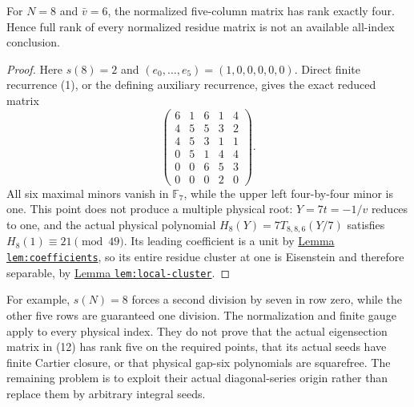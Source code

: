 \documentclass[11pt]{article}
\begin{document}
\begin{proposition}
\label{prop:rank-obstruction}
For $N=8$ and $\bar v=6$, the normalized five-column matrix
has rank exactly four. Hence full rank of every normalized
residue matrix is not an available all-index conclusion.
\end{proposition}
\begin{proof}
Here $s(8)=2$ and $(e_0,\ldots,e_5)=(1,0,0,0,0,0)$.
Direct finite recurrence (1), or the defining auxiliary recurrence,
gives the exact reduced matrix
\[
 \begin{pmatrix}
 6&1&6&1&4\\
 4&5&5&3&2\\
 4&5&3&1&1\\
 0&5&1&4&4\\
 0&0&6&5&3\\
 0&0&0&2&0
 \end{pmatrix}.
\]
All six maximal minors vanish in $\mathbb F_7$, while the
upper left four-by-four minor is one.
This point does not produce a multiple physical root:
$Y=7t=-1/v$ reduces to one, and the actual physical polynomial
$H_8(Y)=7T_{8,8,6}(Y/7)$ satisfies
$H_8(1)\equiv21\pmod{49}$.
Its leading coefficient is a unit by
\href{PHYSICAL_PRIME_TOTAL_DEGREE_REDUCTION.tex}
{Lemma \texttt{lem:coefficients}}, so its entire residue cluster
at one is Eisenstein and therefore separable, by
\href{GAP_SIX_SMALL_OFFSET_FAMILIES.tex}
{Lemma \texttt{lem:local-cluster}}.
\end{proof}

For example, $s(N)=8$ forces a second division by seven in row
zero, while the other five rows are guaranteed one division.
The normalization and finite gauge apply to every physical
index. They do not prove that the actual eigensection matrix
in (12) has rank five on the required points, that its actual
seeds have finite Cartier closure, or that physical gap-six
polynomials are squarefree. The remaining problem is to exploit
their actual diagonal-series origin rather than replace them
by arbitrary integral seeds.
\end{document}
